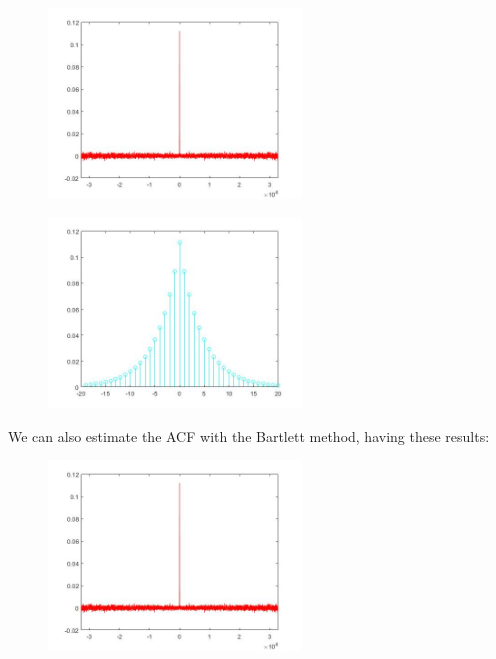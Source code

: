 \documentclass[a4paper,11pt]{article}
\begin{document}
\begin{figure}[!hp]
    \begin{center}
    \includegraphics[width=0.6\textwidth]{images/lab2_figure3.jpg}
    \end{center}
\end{figure}

\begin{figure}[!hp]
    \begin{center}
    \includegraphics[width=0.6\textwidth]{images/lab2_figure2.jpg}
    \end{center}
\end{figure}

\newpage

We can also estimate the ACF with the Bartlett method, having these results:

\begin{figure}[!hp]
    \begin{center}
    \includegraphics[width=0.6\textwidth]{images/lab2_figure3.jpg}
    \end{center}
\end{figure}
\end{document}
